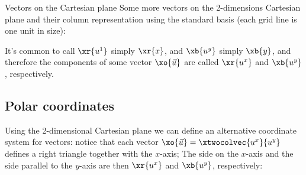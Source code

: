 \begin{example}{Vectors on the Cartesian plane}{}
  Some more vectors on the 2-dimensions Cartesian plane and their column representation using the standard basis (each grid line is one unit in size):

  \begin{center}
  \end{center}
\end{example}

It's common to call $\xr{u^{1}}$ simply $\xr{x}$, and $\xb{u^{y}}$ simply $\xb{y}$, and therefore the components of some vector $\xo{\vec{u}}$ are called $\xr{u^{x}}$ and $\xb{u^{y}}$, respectively.

\subsection{Polar coordinates}
Using the 2-dimensional Cartesian plane we can define an alternative coordinate system for vectors: notice that each vector $\xo{\vec{u}}=\xtwocolvec{u^{x}}{u^{y}}$ defines a right triangle together with the $x$-axis; The side on the $x$-axis and the side parallel to the $y$-axis are then $\xr{u^{x}}$ and $\xb{u^{y}}$, respectively:

